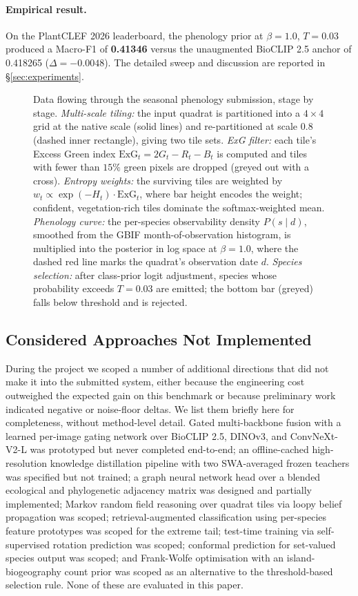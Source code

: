 \documentclass[sigconf]{ceurart}
\begin{document}
\paragraph{Empirical result.} On the PlantCLEF 2026 leaderboard, the phenology prior at $\beta{=}1.0$, $T{=}0.03$ produced a Macro-F1 of \textbf{0.41346} versus the unaugmented BioCLIP 2.5 anchor of 0.418265 ($\Delta = -0.0048$). The detailed sweep and discussion are reported in \S\ref{sec:experiments}.

\begin{figure}[!ht]
  \centering
  \resizebox{\linewidth}{!}{}
  \caption{Data flowing through the seasonal phenology submission, stage by stage. \textit{Multi-scale tiling:} the input quadrat is partitioned into a $4{\times}4$ grid at the native scale (solid lines) and re-partitioned at scale $0.8$ (dashed inner rectangle), giving two tile sets. \textit{ExG filter:} each tile's Excess Green index $\mathrm{ExG}_t = 2G_t - R_t - B_t$ is computed and tiles with fewer than $15\%$ green pixels are dropped (greyed out with a cross). \textit{Entropy weights:} the surviving tiles are weighted by $w_t \propto \exp(-H_t)\cdot\mathrm{ExG}_t$, where bar height encodes the weight; confident, vegetation-rich tiles dominate the softmax-weighted mean. \textit{Phenology curve:} the per-species observability density $P(s\mid d)$, smoothed from the GBIF month-of-observation histogram, is multiplied into the posterior in log space at $\beta{=}1.0$, where the dashed red line marks the quadrat's observation date $d$. \textit{Species selection:} after class-prior logit adjustment, species whose probability exceeds $T{=}0.03$ are emitted; the bottom bar (greyed) falls below threshold and is rejected.}
  \label{fig:phenology_illustration}
\end{figure}
\subsection{Considered Approaches Not Implemented}
\label{sec:not_implemented}
During the project we scoped a number of additional directions that did not make it into the submitted system, either because the engineering cost outweighed the expected gain on this benchmark or because preliminary work indicated negative or noise-floor deltas. We list them briefly here for completeness, without method-level detail. Gated multi-backbone fusion with a learned per-image gating network over BioCLIP 2.5, DINOv3, and ConvNeXt-V2-L was prototyped but never completed end-to-end; an offline-cached high-resolution knowledge distillation pipeline with two SWA-averaged frozen teachers was specified but not trained; a graph neural network head over a blended ecological and phylogenetic adjacency matrix was designed and partially implemented; Markov random field reasoning over quadrat tiles via loopy belief propagation was scoped; retrieval-augmented classification using per-species feature prototypes was scoped for the extreme tail; test-time training via self-supervised rotation prediction was scoped; conformal prediction for set-valued species output was scoped; and Frank-Wolfe optimisation with an island-biogeography count prior was scoped as an alternative to the threshold-based selection rule. None of these are evaluated in this paper.
\end{document}

